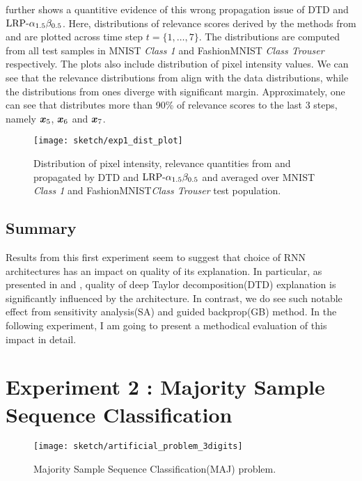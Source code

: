 \addfigure{\ref{fig:exp1_dist_plot}} further shows a quantitive evidence of this wrong propagation issue of DTD and $\text{LRP-}\alpha_{1.5}\beta_{0.5}$. Here, distributions of relevance scores derived by the methods from  and  are plotted across time step $t = \{ 1, \dots, 7 \}$. The distributions are computed from all test samples in MNIST \textit{Class 1} and FashionMNIST \textit{Class Trouser} respectively. The plots also include distribution of pixel intensity values.  We can see that the relevance distributions from  align with the data distributions, while  the distributions from  ones diverge with significant margin. Approximately,  one can see that  distributes more than 90\% of relevance scores to the last 3 steps, namely $\boldsymbol{x}_5$, $\boldsymbol{x}_6$ and $\boldsymbol{x}_7$.


 \begin{figure}[!htb]
\centering
\texttt{[image: sketch/exp1\_dist\_plot]}
\caption{Distribution of pixel intensity, relevance quantities from  and  propagated by DTD and $\text{LRP-}\alpha_{1.5}\beta_{0.5}$ and averaged over MNIST \textit{Class 1} and FashionMNIST\textit{Class Trouser} test population.} 
\label{fig:exp1_dist_plot}
\end{figure}

\subsection{Summary}
Results from this first experiment seem to suggest that choice of RNN architectures has an impact on quality of its explanation.  In particular,  as presented in \addfigure{\ref{fig:class_1_comparison}} and \addfigure{\ref{fig:exp1_dist_plot}}, quality of deep Taylor decomposition(DTD) explanation is significantly influenced by the architecture. In contrast, we do see such notable effect from sensitivity analysis(SA) and guided backprop(GB) method.  In the following experiment, I am going to present a methodical evaluation of this impact in detail.


\section{Experiment 2 : Majority Sample Sequence Classification} \label{sec:exp2}
   
 \begin{figure}[!htb]
\centering
\texttt{[image: sketch/artificial\_problem\_3digits]}
\caption{Majority Sample Sequence Classification(MAJ) problem.} 
\label{fig:artificial_problem_3digits}
\end{figure}

